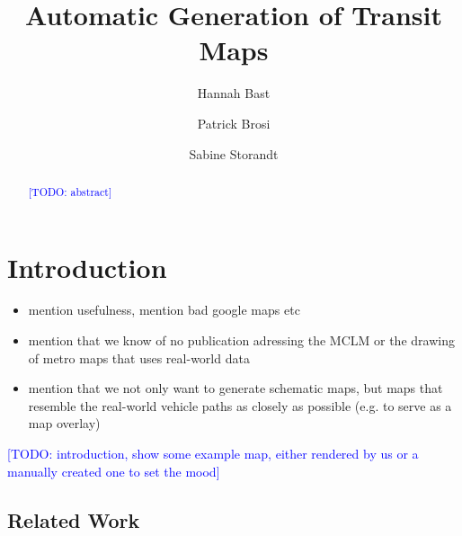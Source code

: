 \documentclass{llncs}
\newcommand\todo[1]{\textcolor{blue}{[TODO: #1]}}
\begin{document}
%
\mainmatter
%
\title{Automatic Generation of Transit Maps}
%
%
\author{Hannah Bast \and Patrick Brosi \and
Sabine Storandt}
%
%
%

\maketitle

\begin{abstract}
	\todo{abstract}
\end{abstract}


%
\section{Introduction}\label{SEC:intro}
%
\begin{itemize}
	\item mention usefulness, mention bad google maps etc
	\item mention that we know of no publication adressing the MCLM or the drawing of metro maps that uses real-world data
	\item mention that we not only want to generate schematic maps, but maps that resemble the real-world vehicle paths as closely as possible (e.g. to serve as a map overlay)
\end{itemize}
\todo{introduction, show some example map, either rendered by us or a manually created one to set the mood}

%
\subsection{Related Work}\label{SEC:related}
%
\end{document}
